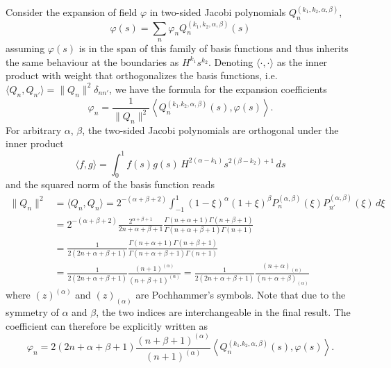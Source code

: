 Consider the expansion of field $\varphi$ in two-sided Jacobi polynomials $Q_n^{(k_1, k_2, \alpha, \beta)}$,
%
\begin{equation}
    \varphi(s) = \sum_n \varphi_n Q_n^{(k_1, k_2, \alpha, \beta)}(s)
\end{equation}
%
assuming $\varphi(s)$ is in the span of this family of basis functions and thus inherits the same behaviour at the boundaries as $H^{k_1} s^{k_2}$. Denoting $\langle \cdot, \cdot \rangle$ as the inner product with weight that orthogonalizes the basis functions, i.e. $\langle Q_n, Q_{n'}\rangle = \|Q_n\|^2 \delta_{nn'}$, we have the formula for the expansion coefficients
%
\begin{equation}
    \varphi_n = \frac{1}{\|Q_n\|^2} \left\langle Q_n^{(k_1. k_2, \alpha, \beta)}(s), \varphi(s) \right\rangle.
\end{equation}
%
For arbitrary $\alpha$, $\beta$, the two-sided Jacobi polynomials are orthogonal under the inner product
%
\[
    \langle f, g \rangle = \int_0^1 f(s) g(s) \, H^{2(\alpha - k_1)} s^{2(\beta - k_2) + 1} \, ds
\]
%
and the squared norm of the basis function reads
%
\begin{equation}
\begin{aligned}
    \|Q_n\|^2 &= \langle Q_n, Q_n \rangle = 2^{-(\alpha + \beta + 2)} \int_{-1}^1 (1 - \xi)^\alpha (1 + \xi)^\beta P_n^{(\alpha, \beta)}(\xi) P_{n'}^{(\alpha, \beta)}(\xi) \, d\xi \\ 
    &= 2^{-(\alpha + \beta + 2)} \frac{2^{\alpha + \beta + 1}}{2n + \alpha + \beta + 1} \frac{\Gamma(n + \alpha + 1) \Gamma(n + \beta + 1)}{\Gamma(n + \alpha + \beta + 1) \Gamma(n + 1)} \\ 
    &= \frac{1}{2(2n + \alpha + \beta + 1)} \frac{\Gamma(n + \alpha + 1) \Gamma(n + \beta + 1)}{\Gamma(n + \alpha + \beta + 1) \Gamma(n + 1)} \\ 
    &= \frac{1}{2(2n + \alpha + \beta + 1)} \frac{(n + 1)^{(\alpha)}}{(n + \beta + 1)^{(\alpha)}} = \frac{1}{2(2n + \alpha + \beta + 1)} \frac{(n + \alpha)_{(\alpha)}}{(n + \alpha + \beta)_{(\alpha)}}
\end{aligned}
\end{equation}
%
where $(z)^{(\alpha)}$ and $(z)_{(\alpha)}$ are Pochhammer's symbols. Note that due to the symmetry of $\alpha$ and $\beta$, the two indices are interchangeable in the final result. The coefficient can therefore be explicitly written as
%
\begin{equation}
    \varphi_n = 2(2n + \alpha + \beta + 1) \frac{(n + \beta + 1)^{(\alpha)}}{(n + 1)^{(\alpha)}} \left\langle Q_n^{(k_1. k_2, \alpha, \beta)}(s), \varphi(s) \right\rangle.
\end{equation}
